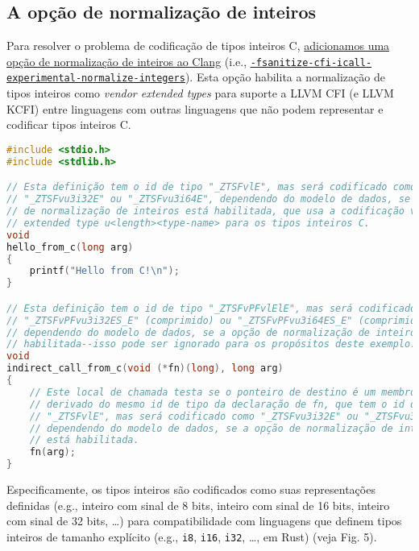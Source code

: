 \documentclass{article}
\begin{document}
\subsection{A opção de normalização de inteiros}

Para resolver o problema de codificação de tipos inteiros C, \href{https://reviews.llvm.org/D139395}{adicionamos uma opção de normalização de inteiros ao Clang} (i.e., \href{https://clang.llvm .org/docs/ControlFlowIntegrity.html#fsanitize-cfi-icall-experimental-normalize-integers}{\texttt{-fsanitize-cfi-icall-experimental-normalize-integers}}). Esta opção habilita a normalização de tipos inteiros como \textit{vendor extended types} para suporte a LLVM CFI (e LLVM KCFI) entre linguagens com outras linguagens que não podem representar e codificar tipos inteiros C.

\begin{lstlisting}[language=C, caption={Exemplo de biblioteca C usando tipos inteiros C e codificação Clang com a opção de normalização de inteiros habilitada.}]
#include <stdio.h>
#include <stdlib.h>

// Esta definição tem o id de tipo "_ZTSFvlE", mas será codificado como
// "_ZTSFvu3i32E" ou "_ZTSFvu3i64E", dependendo do modelo de dados, se a opção
// de normalização de inteiros está habilitada, que usa a codificação vendor
// extended type u<length><type-name> para os tipos inteiros C.
void
hello_from_c(long arg)
{
    printf("Hello from C!\n");
}

// Esta definição tem o id de tipo "_ZTSFvPFvlElE", mas será codificado como
// "_ZTSFvPFvu3i32ES_E" (comprimido) ou "_ZTSFvPFvu3i64ES_E" (comprimido),
// dependendo do modelo de dados, se a opção de normalização de inteiros está
// habilitada--isso pode ser ignorado para os propósitos deste exemplo.
void
indirect_call_from_c(void (*fn)(long), long arg)
{
    // Este local de chamada testa se o ponteiro de destino é um membro do grupo
    // derivado do mesmo id de tipo da declaração de fn, que tem o id de tipo
    // "_ZTSFvlE", mas será codificado como "_ZTSFvu3i32E" ou "_ZTSFvu3i64E",
    // dependendo do modelo de dados, se a opção de normalização de inteiros
    // está habilitada.
    fn(arg);
}
\end{lstlisting}

Especificamente, os tipos inteiros são codificados como suas representações definidas (e.g., inteiro com sinal de 8 bits, inteiro com sinal de 16 bits, inteiro com sinal de 32 bits, …) para compatibilidade com linguagens que definem tipos inteiros de tamanho explícito (e.g., \texttt{i8}, \texttt{i16}, \texttt{i32}, …, em Rust) (veja Fig. 5).
\end{document}
